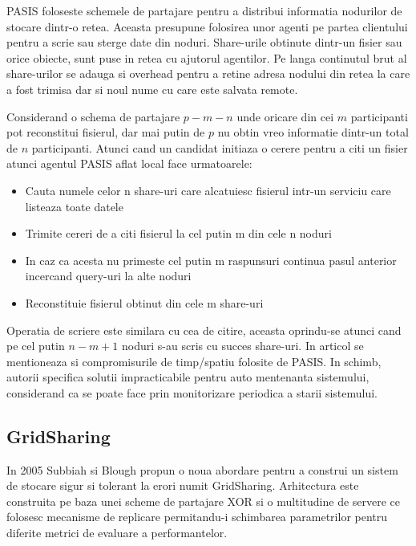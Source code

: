 \documentclass{llncs}
\begin{document}
PASIS foloseste schemele de partajare pentru a distribui informatia nodurilor de stocare dintr-o retea. Aceasta presupune folosirea unor agenti pe partea clientului pentru a scrie sau sterge date din noduri. Share-urile obtinute dintr-un fisier sau orice obiecte, sunt puse in retea cu ajutorul agentilor. Pe langa continutul brut al share-urilor se adauga si overhead pentru a retine adresa nodului din retea la care a fost trimisa dar si noul nume cu care este salvata remote.

Considerand o schema de partajare $p-m-n$ unde oricare din cei $m$ participanti pot reconstitui fisierul, dar mai putin de $p$ nu obtin vreo informatie dintr-un total de $n$ participanti. Atunci cand un candidat initiaza o cerere pentru a citi un fisier atunci agentul PASIS aflat local face urmatoarele: 
\begin{itemize}
	\item Cauta numele celor n share-uri care alcatuiesc fisierul intr-un serviciu care listeaza toate datele
	\item Trimite cereri de a citi fisierul la cel putin m din cele n noduri
	\item In caz ca acesta nu primeste cel putin m raspunsuri continua pasul anterior incercand query-uri la alte noduri
	\item Reconstituie fisierul obtinut din cele m share-uri
\end{itemize}
Operatia de scriere este similara cu cea de citire, aceasta oprindu-se atunci cand pe cel putin $n - m + 1$ noduri s-au scris cu succes share-uri.
In articol se mentioneaza si compromisurile de timp/spatiu folosite de PASIS. In schimb, autorii specifica solutii impracticabile pentru auto mentenanta sistemului, considerand ca se poate face prin monitorizare periodica a starii sistemului.

\subsection{GridSharing} 
In 2005 Subbiah si Blough propun o noua abordare pentru a construi un sistem de stocare sigur si tolerant la erori numit GridSharing.
Arhitectura este construita pe baza unei scheme de partajare XOR si o multitudine de servere ce folosesc mecanisme de replicare permitandu-i schimbarea parametrilor pentru diferite metrici de evaluare a performantelor. \cite{SB:2005}
\end{document}
